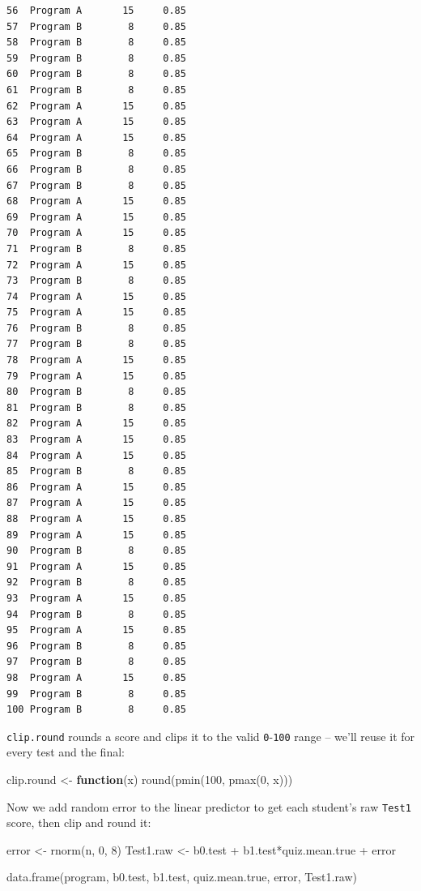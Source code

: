\documentclass[
  letterpaper,
  DIV=11,
  numbers=noendperiod]{scrreprt}
\newenvironment{Shaded}{\begin{snugshade}}{\end{snugshade}}
\newcommand{\ControlFlowTok}[1]{\textcolor[rgb]{0.00,0.23,0.31}{\textbf{#1}}}
\newcommand{\DecValTok}[1]{\textcolor[rgb]{0.68,0.00,0.00}{#1}}
\newcommand{\FunctionTok}[1]{\textcolor[rgb]{0.28,0.35,0.67}{#1}}
\newcommand{\NormalTok}[1]{\textcolor[rgb]{0.00,0.23,0.31}{#1}}
\newcommand{\OtherTok}[1]{\textcolor[rgb]{0.00,0.23,0.31}{#1}}
\newcommand{\SpecialCharTok}[1]{\textcolor[rgb]{0.37,0.37,0.37}{#1}}
\begin{document}
\begin{verbatim}
56  Program A       15     0.85
57  Program B        8     0.85
58  Program B        8     0.85
59  Program B        8     0.85
60  Program B        8     0.85
61  Program B        8     0.85
62  Program A       15     0.85
63  Program A       15     0.85
64  Program A       15     0.85
65  Program B        8     0.85
66  Program B        8     0.85
67  Program B        8     0.85
68  Program A       15     0.85
69  Program A       15     0.85
70  Program A       15     0.85
71  Program B        8     0.85
72  Program A       15     0.85
73  Program B        8     0.85
74  Program A       15     0.85
75  Program A       15     0.85
76  Program B        8     0.85
77  Program B        8     0.85
78  Program A       15     0.85
79  Program A       15     0.85
80  Program B        8     0.85
81  Program B        8     0.85
82  Program A       15     0.85
83  Program A       15     0.85
84  Program A       15     0.85
85  Program B        8     0.85
86  Program A       15     0.85
87  Program A       15     0.85
88  Program A       15     0.85
89  Program A       15     0.85
90  Program B        8     0.85
91  Program A       15     0.85
92  Program B        8     0.85
93  Program A       15     0.85
94  Program B        8     0.85
95  Program A       15     0.85
96  Program B        8     0.85
97  Program B        8     0.85
98  Program A       15     0.85
99  Program B        8     0.85
100 Program B        8     0.85
\end{verbatim}

\texttt{clip.round} rounds a score and clips it to the valid
\texttt{0}-\texttt{100} range -- we'll reuse it for every test and the
final:

\begin{Shaded}
\begin{Highlighting}[]
\NormalTok{clip.round }\OtherTok{\textless{}{-}} \ControlFlowTok{function}\NormalTok{(x) }\FunctionTok{round}\NormalTok{(}\FunctionTok{pmin}\NormalTok{(}\DecValTok{100}\NormalTok{, }\FunctionTok{pmax}\NormalTok{(}\DecValTok{0}\NormalTok{, x)))}
\end{Highlighting}
\end{Shaded}

Now we add random error to the linear predictor to get each student's
raw \texttt{Test1} score, then clip and round it:

\begin{Shaded}
\begin{Highlighting}[]
\NormalTok{error }\OtherTok{\textless{}{-}} \FunctionTok{rnorm}\NormalTok{(n, }\DecValTok{0}\NormalTok{, }\DecValTok{8}\NormalTok{)}
\NormalTok{Test1.raw }\OtherTok{\textless{}{-}}\NormalTok{ b0.test }\SpecialCharTok{+}\NormalTok{ b1.test}\SpecialCharTok{*}\NormalTok{quiz.mean.true }\SpecialCharTok{+}\NormalTok{ error}

\FunctionTok{data.frame}\NormalTok{(program, b0.test, b1.test, quiz.mean.true, error, Test1.raw)}
\end{Highlighting}
\end{Shaded}
\end{document}
